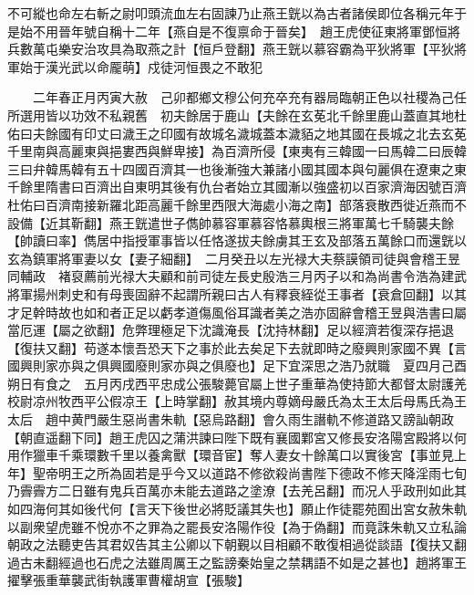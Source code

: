 不可縱也命左右斬之尉叩頭流血左右固諫乃止燕王皝以為古者諸侯即位各稱元年于是始不用晉年號自稱十二年【燕自是不復禀命于晉矣】　趙王虎使征東將軍鄧恒將兵數萬屯樂安治攻具為取燕之計【恒戶登翻】燕王皝以慕容霸為平狄將軍【平狄將軍始于漢光武以命龎萌】戍徒河恒畏之不敢犯

　　二年春正月丙寅大赦　己卯都鄉文穆公何充卒充有器局臨朝正色以社稷為己任所選用皆以功效不私親舊　初夫餘居于鹿山【夫餘在玄莬北千餘里鹿山蓋直其地杜佑曰夫餘國有印丈曰濊王之印國有故城名濊城蓋本濊貊之地其國在長城之北去玄莬千里南與高麗東與挹婁西與鮮卑接】為百濟所侵【東夷有三韓國一曰馬韓二曰辰韓三曰弁韓馬韓有五十四國百濟其一也後漸強大兼諸小國其國本與句麗俱在遼東之東千餘里隋書曰百濟出自東明其後有仇台者始立其國漸以強盛初以百家濟海因號百濟杜佑曰百濟南接新羅北距高麗千餘里西限大海處小海之南】部落衰散西徙近燕而不設備【近其靳翻】燕王皝遣世子儁帥慕容軍慕容恪慕輿根三將軍萬七千騎襲夫餘【帥讀曰率】儁居中指授軍事皆以任恪遂拔夫餘虜其王玄及部落五萬餘口而還皝以玄為鎮軍將軍妻以女【妻子細翻】　二月癸丑以左光禄大夫蔡謨領司徒與會稽王昱同輔政　褚裒薦前光禄大夫顧和前司徒左長史殷浩三月丙子以和為尚書令浩為建武將軍揚州刺史和有母喪固辭不起謂所親曰古人有釋衰絰從王事者【衰倉回翻】以其才足幹時故也如和者正足以虧孝道傷風俗耳識者美之浩亦固辭會稽王昱與浩書曰屬當厄運【屬之欲翻】危弊理極足下沈識淹長【沈持林翻】足以經濟若復深存挹退【復扶又翻】苟遂本懷吾恐天下之事於此去矣足下去就即時之廢興則家國不異【言國興則家亦與之俱興國廢則家亦與之俱廢也】足下宜深思之浩乃就職　夏四月己酉朔日有食之　五月丙戌西平忠成公張駿薨官屬上世子重華為使持節大都督太尉護羌校尉凉州牧西平公假凉王【上時掌翻】赦其境内尊嫡母嚴氏為太王太后母馬氏為王太后　趙中黄門嚴生惡尚書朱軌【惡烏路翻】會久雨生譖軌不修道路又謗訕朝政【朝直遥翻下同】趙王虎囚之蒲洪諫曰陛下既有襄國鄴宮又修長安洛陽宮殿將以何用作獵車千乘環數千里以養禽獸【環音宦】奪人妻女十餘萬口以實後宮【事並見上年】聖帝明王之所為固若是乎今又以道路不修欲殺尚書陛下德政不修天降淫雨七旬乃霽霽方二日雖有鬼兵百萬亦未能去道路之塗潦【去羌呂翻】而况人乎政刑如此其如四海何其如後代何【言天下後世必將貶議其失也】願止作徒罷苑囿出宮女赦朱軌以副衆望虎雖不悅亦不之罪為之罷長安洛陽作役【為于偽翻】而竟誅朱軌又立私論朝政之法聽吏告其君奴告其主公卿以下朝覲以目相顧不敢復相過從談語【復扶又翻過古未翻經過也石虎之法雖周厲王之監謗秦始皇之禁耦語不如是之甚也】趙將軍王擢擊張重華襲武街執護軍曹權胡宣【張駿】

